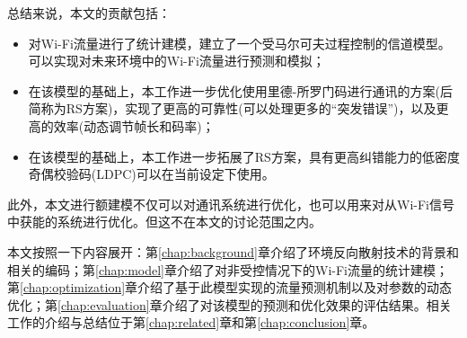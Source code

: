 
总结来说，本文的贡献包括：

\begin{itemize}
	\item 对Wi-Fi流量进行了统计建模，建立了一个受马尔可夫过程控制的信道模型。可以实现对未来环境中的Wi-Fi流量进行预测和模拟；
	
	\item 在该模型的基础上，本工作进一步优化使用里德-所罗门码进行通讯的方案(后简称为RS方案)，实现了更高的可靠性(可以处理更多的“突发错误”)，以及更高的效率(动态调节帧长和码率)；
	
	\item 在该模型的基础上，本工作进一步拓展了RS方案，具有更高纠错能力的低密度奇偶校验码(LDPC)可以在当前设定下使用。
\end{itemize}

此外，本文进行额建模不仅可以对通讯系统进行优化，也可以用来对从Wi-Fi信号中获能的系统进行优化。但这不在本文的讨论范围之内。

本文按照一下内容展开：第\ref{chap:background}章介绍了环境反向散射技术的背景和相关的编码；第\ref{chap:model}章介绍了对非受控情况下的Wi-Fi流量的统计建模；第\ref{chap:optimization}章介绍了基于此模型实现的流量预测机制以及对参数的动态优化；第\ref{chap:evaluation}章介绍了对该模型的预测和优化效果的评估结果。相关工作的介绍与总结位于第\ref{chap:related}章和第\ref{chap:conclusion}章。
